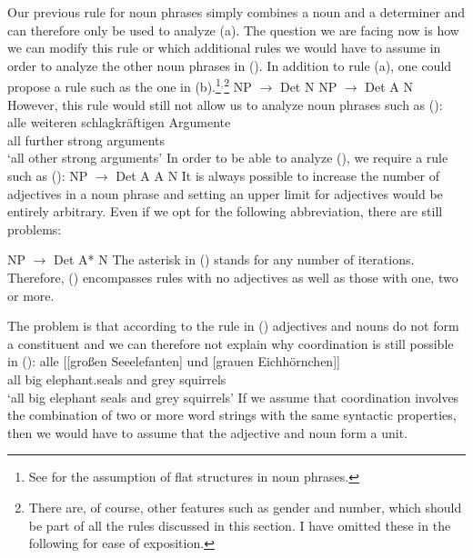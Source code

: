 Our previous rule for noun phrases simply combines a noun and a determiner and can therefore only be used to
analyze (a). The question we are facing now is how we can modify this rule or which additional rules we would
have to assume in order to analyze the other noun phrases in (). In addition to rule (a), one could propose 
a rule such as the one in (b).\footnote{%
	See  for the assumption of flat structures in noun phrases.
}$^,$\footnote{%
	There are, of course, other features such as gender and number, which should be part of all the rules
	discussed in this section. I have omitted these in the following for ease of exposition.
}
\eal
\ex NP $\to$ Det N
\ex NP $\to$ Det A N
\zl
However, this rule would still not allow us to analyze noun phrases such as ():
\ea
\label{Beispiel-alle-weitern-schlagkraeftigen-Argumente}
\gll alle weiteren schlagkräftigen Argumente\\
	 all further strong arguments\\
\glt `all other strong arguments'
\z
In order to be able to analyze (), we require a rule such as (): 
\ea 
NP $\to$ Det A A N
\z
It is always possible to increase the number of adjectives in a noun phrase and setting an upper limit for
adjectives would be entirely arbitrary. Even if we opt for the following abbreviation, there are still problems:

\ea 
NP $\to$ Det A* N
\z
The asterisk\is{*} in () stands for any number of iterations. Therefore, () encompasses rules with no adjectives
as well as those with one, two or more.

The problem is that according to the rule in () adjectives and nouns do not form a constituent and we can therefore not explain why coordination 
is still possible in ():
\ea
\gll alle [[großen Seeelefanten] und [grauen Eichhörnchen]]\\
     all  \spacebr{}\spacebr{}big elephant.seals and  \spacebr{}grey squirrels\\
\glt `all big elephant seals and grey squirrels'	 
\z
If we assume that coordination involves the combination of two or more word strings with the same syntactic properties, then we would have to assume
that the adjective and noun form a unit.

